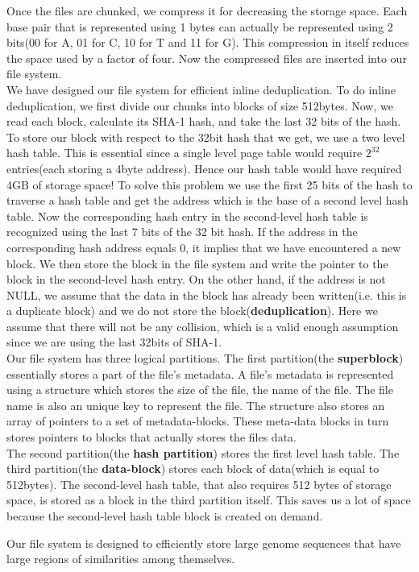 \documentclass {article}
\begin{document}
\noindent Once the files are chunked, we compress it for decreasing the storage space. Each base pair that is represented using 1 bytes can actually be represented using 2 bits(00 for A, 01 for C, 10 for T and 11 for G). This compression in itself reduces the space used by a factor of four. Now the compressed files are inserted into our file system.\\

\noindent We have designed our file system for efficient inline deduplication. To do inline deduplication, we first divide our chunks into blocks of size 512bytes. Now, we read each block, calculate its SHA-1 hash, and take the last 32 bits of the hash.\\ 

\noindent To store our block with respect to the 32bit hash that we get, we use a two level hash table. This is essential since a single level page table would require $2^{32}$ entries(each storing a 4byte address). Hence our hash table would have required 4GB of storage space! To solve this problem we use the first 25 bits of the hash to traverse a hash table and get the address which is the base of a second level hash table. Now the corresponding hash entry in the second-level hash table is recognized using the last 7 bits of the 32 bit hash. If the address in the corresponding hash address equals 0, it implies that we have encountered a new block. We then store the block in the file system and write the pointer to the block in the second-level hash entry. On the other hand, if the address is not NULL, we assume that the data in the block has already been written(i.e. this is a duplicate block) and we do not store the block(\textbf{deduplication}). Here we assume that there will not be any collision, which is a valid enough assumption since we are using the last 32bits of SHA-1.\\

\noindent Our file system has three logical partitions. The first partition(the \textbf{superblock}) essentially stores a part of the file's metadata. A file's metadata is represented using a structure which stores the size of the file, the name of the file. The file name is also an unique key to represent the file. The structure also stores an array of pointers to a set of metadata-blocks. These meta-data blocks in turn stores pointers to blocks that actually stores the files data.\\ 

\noindent The second partition(the \textbf{hash partition}) stores the first level hash table. The third partition(the \textbf{data-block}) stores each block of data(which is equal to 512bytes). The second-level hash table, that also requires 512 bytes of storage space, is stored as a block in the third partition itself. This saves us a lot of space because the second-level hash table block is created on demand.    

\noindent Our file system is designed to efficiently store large genome sequences that have large regions of similarities among themselves. 
\end{document}
